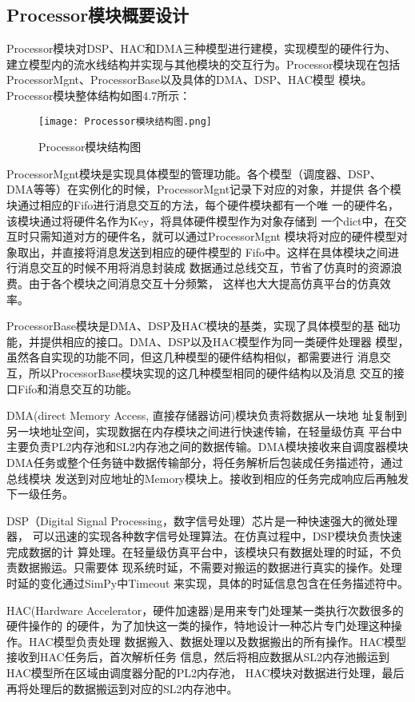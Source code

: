 \subsection{Processor模块概要设计}
Processor模块对DSP、HAC和DMA三种模型进行建模，实现模型的硬件行为、
建立模型内的流水线结构并实现与其他模块的交互行为\cite{33}。Processor模块现在包括
ProcessorMgnt、ProcessorBase以及具体的DMA、DSP、HAC模型
模块。Processor模块整体结构如图4.7所示：
\begin{figure}[htb]
    \centering
    \texttt{[image: Processor模块结构图.png]}
    \caption{Processor模块结构图}
    \label{fig:badge}
\end{figure}

ProcessorMgnt模块是实现具体模型的管理功能。各个模型（调度器、DSP、
DMA等等）在实例化的时候，ProcessorMgnt记录下对应的对象，并提供
各个模块通过相应的Fifo进行消息交互的方法，每个硬件模块都有一个唯
一的硬件名，该模块通过将硬件名作为Key，将具体硬件模型作为对象存储到
一个dict中，在交互时只需知道对方的硬件名，就可以通过ProcessorMgnt
模块将对应的硬件模型对象取出，并直接将消息发送到相应的硬件模型的
Fifo中。这样在具体模块之间进行消息交互的时候不用将消息封装成
数据通过总线交互，节省了仿真时的资源浪费。由于各个模块之间消息交互十分频繁，
这样也大大提高仿真平台的仿真效率。

ProcessorBase模块是DMA、DSP及HAC模块的基类，实现了具体模型的基
础功能，并提供相应的接口。DMA、DSP以及HAC模型作为同一类硬件处理器
模型，虽然各自实现的功能不同，但这几种模型的硬件结构相似，都需要进行
消息交互，所以ProcessorBase模块实现的这几种模型相同的硬件结构以及消息
交互的接口Fifo和消息交互的功能。

DMA(direct Memory Access, 直接存储器访问)模块负责将数据从一块地
址复制到另一块地址空间，实现数据在内存模块之间进行快速传输，在轻量级仿真
平台中主要负责PL2内存池和SL2内存池之间的数据传输。DMA模块接收来自调度器模块
DMA任务或整个任务链中数据传输部分，将任务解析后包装成任务描述符，通过总线模块
发送到对应地址的Memory模块上。接收到相应的任务完成响应后再触发下一级任务。

DSP（Digital Signal Processing，数字信号处理）芯片是一种快速强大的微处理器，
可以迅速的实现各种数字信号处理算法。在仿真过程中，DSP模块负责快速完成数据的计
算处理。在轻量级仿真平台中，该模块只有数据处理的时延，不负责数据搬运。只需要体
现系统时延，不需要对搬运的数据进行真实的操作。处理时延的变化通过SimPy中Timeout
来实现，具体的时延信息包含在任务描述符中。

HAC(Hardware Accelerator，硬件加速器)是用来专门处理某一类执行次数很多的硬件操作的
的硬件，为了加快这一类的操作，特地设计一种芯片专门处理这种操作。HAC模型负责处理
数据搬入、数据处理以及数据搬出的所有操作。HAC模型接收到HAC任务后，首次解析任务
信息，然后将相应数据从SL2内存池搬运到HAC模型所在区域由调度器分配的PL2内存池，
HAC模块对数据进行处理，最后再将处理后的数据搬运到对应的SL2内存池中。

